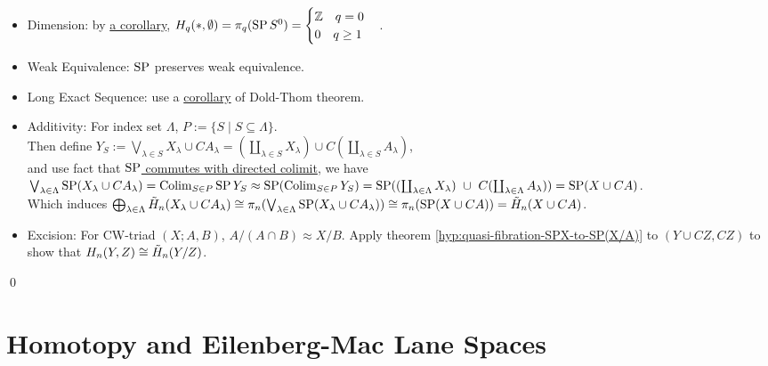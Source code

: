     \begin{prf}
        \text{ }\\
        \begin{itemize}
            \item Dimension: by \hyperref[hyp:SP-Sn-is-K(Z,n)]{a corollary}, $H_q(\ast, \emptyset) = \pi_q(\operatorname{SP} S^0) =
            \begin{cases}
                \mathbb Z \quad q = 0\\
                0  \quad q \geq 1
            \end{cases}$.
            \item Weak Equivalence: $\operatorname{SP}$ preserves weak equivalence.
            \item Long Exact Sequence: use a \hyperref[hyp:quasi-fibration-SP(XUAxI)-to-SP(XUCA)]{corollary}
                of Dold-Thom theorem.
            \item Additivity:
                For index set $\Lambda$, $P := \{S \mid S \subseteq \Lambda \}$.\\
                Then define $Y_S := \bigvee_{\lambda \in S} X_\lambda \cup CA_\lambda = (\coprod_{\lambda \in S} X_\lambda) \cup C (\coprod_{\lambda \in S} A_\lambda)$,\\
                and use fact that \hyperref[hyp:SP-commute-with-directed-colimit]{$\operatorname{SP}$ commutes with directed colimit}, we have\\
                $\bigvee_{\lambda \in \Lambda} \operatorname{SP} (X_\lambda \cup CA_\lambda) = \operatorname{Colim}_{S \in P} \operatorname{SP} Y_S \approx  \operatorname{SP} (\operatorname{Colim}_{S \in P} Y_S) = \operatorname{SP} ((\coprod_{\lambda \in \Lambda} X_\lambda) \ \cup \ C (\coprod_{\lambda \in \Lambda} A_\lambda)) = \operatorname{SP} ( X \cup CA)$.\\
                Which induces $\bigoplus_{\lambda \in \Lambda} \tilde{H}_n(X_\lambda \cup C A_\lambda) \cong \pi_n (\bigvee_{\lambda \in \Lambda} \operatorname{SP} (X_\lambda \cup CA_\lambda)) \cong \pi_n(\operatorname{SP} (X \cup CA)) = \tilde{H}_n(X \cup CA)$.
            \item Excision: For CW-triad $(X;A,B)$,
                $A/(A \cap B) \approx X/B$.
                Apply theorem \ref{hyp:quasi-fibration-SPX-to-SP(X/A)} to $(Y \cup CZ, CZ)$ to show that
                $H_n(Y,Z) \cong \tilde{H}_n(Y/Z)$.\\
        \end{itemize}
        \qed
    \end{prf}

    \section{Homotopy and Eilenberg-Mac Lane Spaces}

